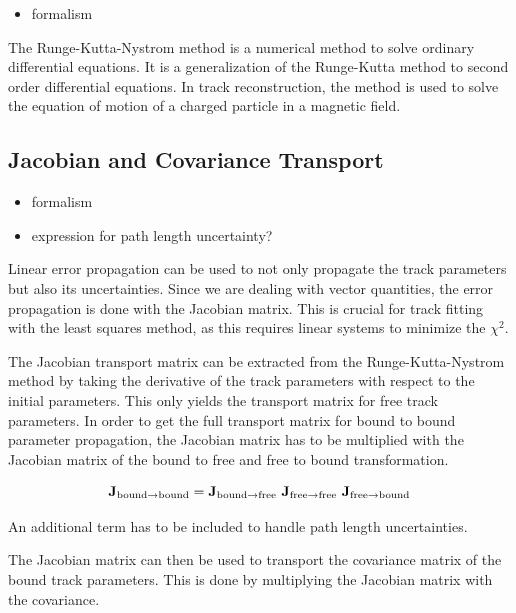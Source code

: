\begin{itemize}
    \color{red}
    \item formalism
\end{itemize}

The Runge-Kutta-Nystrom method is a numerical method to solve ordinary differential equations. It is a generalization of the Runge-Kutta method to second order differential equations. In track reconstruction, the method is used to solve the equation of motion of a charged particle in a magnetic field.

\subsection{Jacobian and Covariance Transport}

\begin{itemize}
    \color{red}
    \item formalism
    \item expression for path length uncertainty?
\end{itemize}

Linear error propagation can be used to not only propagate the track parameters but also its uncertainties. Since we are dealing with vector quantities, the error propagation is done with the Jacobian matrix. This is crucial for track fitting with the least squares method, as this requires linear systems to minimize the $\chi^2$.

The Jacobian transport matrix can be extracted from the Runge-Kutta-Nystrom method by taking the derivative of the track parameters with respect to the initial parameters. This only yields the transport matrix for free track parameters. In order to get the full transport matrix for bound to bound parameter propagation, the Jacobian matrix has to be multiplied with the Jacobian matrix of the bound to free and free to bound transformation.

\begin{equation}
    \mathbf{J}_{\text{bound\textrightarrow bound}} = \mathbf{J}_{\text{bound\textrightarrow free}} \ \mathbf{J}_{\text{free\textrightarrow free}} \ \mathbf{J}_{\text{free\textrightarrow bound}}
\end{equation}

An additional term has to be included to handle path length uncertainties.

The Jacobian matrix can then be used to transport the covariance matrix of the bound track parameters. This is done by multiplying the Jacobian matrix with the covariance.

